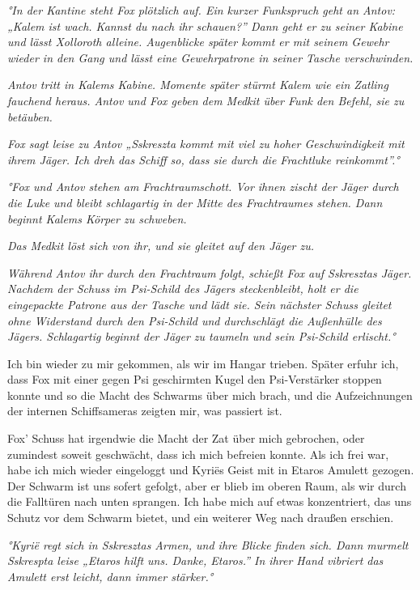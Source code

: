 \documentclass[11pt]{scrartcl}
\begin{document}
\emph{°In der Kantine steht Fox plötzlich auf. Ein kurzer Funkspruch
geht an Antov: „Kalem ist wach. Kannst du nach ihr schauen?'' Dann geht
er zu seiner Kabine und lässt Xolloroth alleine. Augenblicke später
kommt er mit seinem Gewehr wieder in den Gang und lässt eine
Gewehrpatrone in seiner Tasche verschwinden.}

\emph{Antov tritt in Kalems Kabine. Momente später stürmt Kalem wie ein
Zatling fauchend heraus. Antov und Fox geben dem Medkit über Funk den
Befehl, sie zu betäuben.}

\emph{Fox sagt leise zu Antov „Sskreszta kommt mit viel zu hoher
Geschwindigkeit mit ihrem Jäger. Ich dreh das Schiff so, dass sie durch
die Frachtluke reinkommt''.°}

\emph{°Fox und Antov stehen am Frachtraumschott. Vor ihnen zischt der
Jäger durch die Luke und bleibt schlagartig in der Mitte des
Frachtraumes stehen. Dann beginnt Kalems Körper zu schweben.}

\emph{Das Medkit löst sich von ihr, und sie gleitet auf den Jäger zu.}

\emph{Während Antov ihr durch den Frachtraum folgt, schießt Fox auf
Sskresztas Jäger. Nachdem der Schuss im Psi-Schild des Jägers
steckenbleibt, holt er die eingepackte Patrone aus der Tasche und lädt
sie. Sein nächster Schuss gleitet ohne Widerstand durch den Psi-Schild
und durchschlägt die Außenhülle des Jägers. Schlagartig beginnt der
Jäger zu taumeln und sein Psi-Schild erlischt.°}

Ich bin wieder zu mir gekommen, als wir im Hangar trieben. Später erfuhr
ich, dass Fox mit einer gegen Psi geschirmten Kugel den Psi-Verstärker
stoppen konnte und so die Macht des Schwarms über mich brach, und die
Aufzeichnungen der internen Schiffsameras zeigten mir, was passiert ist.

Fox' Schuss hat irgendwie die Macht der Zat über mich gebrochen, oder
zumindest soweit geschwächt, dass ich mich befreien konnte. Als ich frei
war, habe ich mich wieder eingeloggt und Kyriës Geist mit in Etaros
Amulett gezogen. Der Schwarm ist uns sofert gefolgt, aber er blieb im
oberen Raum, als wir durch die Falltüren nach unten sprangen. Ich habe
mich auf etwas konzentriert, das uns Schutz vor dem Schwarm bietet, und
ein weiterer Weg nach draußen erschien.

\emph{°Kyrië regt sich in Sskresztas Armen, und ihre Blicke finden sich.
Dann murmelt Sskrespta leise „Etaros hilft uns. Danke, Etaros.'' In
ihrer Hand vibriert das Amulett erst leicht, dann immer stärker.°}
\end{document}
